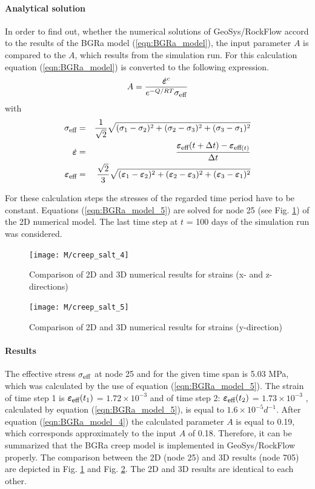 \paragraph*{Analytical solution}
%
In order to find out, whether the numerical solutions of
GeoSys/RockFlow accord to the results of the BGRa model
(\ref{eqn:BGRa_model}), the input parameter $A$ is compared to the
$A$, which results from the simulation run. For this calculation
equation (\ref{eqn:BGRa_model}) is converted to the following
expression.
%
\begin{equation}
A
=
\frac
{\dot{\boldsymbol{\varepsilon}}^{c}}
{e^{-Q/RT} \sigma_{\mbox{\footnotesize eff}}}
\label{eqn:BGRa_model_4}
\end{equation}
%
with
%
\begin{eqnarray}
\sigma_{\mbox{\footnotesize eff}}
&=&
\frac{1}{\sqrt{2}}
\sqrt{(\sigma_1-\sigma_2)^2 + (\sigma_2-\sigma_3)^2 + (\sigma_3-\sigma_1)^2}
\nonumber
\\
\dot{\boldsymbol{\varepsilon}}
&=&
\frac
{\boldsymbol{\varepsilon}_{\mbox{\footnotesize eff}}(t+\Delta t) - \boldsymbol{\varepsilon}_{\mbox{\footnotesize eff}(t)}}
{\Delta t}
\\
\boldsymbol{\varepsilon}_{\mbox{\footnotesize eff}}
&=&
\frac{\sqrt{2}}{3}
\sqrt{(\boldsymbol{\varepsilon}_1-\boldsymbol{\varepsilon}_2)^2 + (\boldsymbol{\varepsilon}_2-\boldsymbol{\varepsilon}_3)^2 + (\boldsymbol{\varepsilon}_3-\boldsymbol{\varepsilon}_1)^2}
\nonumber
\label{eqn:BGRa_model_5}
\end{eqnarray}

For these calculation steps the stresses of the regarded time period
have to be constant. Equations (\ref{eqn:BGRa_model_5}) are solved
for node 25 (see Fig. \ref{fig:creep_salt_4}) of the 2D numerical
model. The last time step at $t$ = 100 days of the simulation run
was considered.
%
\begin{figure}[H]
\centering
\texttt{[image: M/creep\_salt\_4]}
\caption{Comparison of 2D and 3D numerical results for strains (x- and z-directions)}
\label{fig:creep_salt_4}
\end{figure}
%
\begin{figure}[H]
\centering
\texttt{[image: M/creep\_salt\_5]}
\caption{Comparison of 2D and 3D numerical results for strains (y-direction)}
\label{fig:creep_salt_5}
\end{figure}

\paragraph*{Results}
%
The effective stress $\sigma_{\mbox{\footnotesize eff}}$ at node 25
and for the given time span is 5.03 MPa, which was calculated by the
use of equation (\ref{eqn:BGRa_model_5}). The strain of time step 1
is $\boldsymbol{\varepsilon}_{\mbox{\footnotesize eff}}(t_1)$ = $1.72\times 10^{-3}$
and of time step 2: $\boldsymbol{\varepsilon}_{\mbox{\footnotesize eff}}(t_2)$ =
$1.73\times 10^{-3}$ , calculated by equation
(\ref{eqn:BGRa_model_5}), is equal to $1.6 \times 10^{-5} d^{-1}$.
After equation (\ref{eqn:BGRa_model_4}) the calculated parameter $A$
is equal to 0.19, which corresponds approximately to the input $A$
of 0.18. Therefore, it can be summarized that the BGRa creep model
is implemented in GeoSys/RockFlow properly. The comparison between
the 2D (node 25) and 3D results (node 705) are depicted in Fig.
\ref{fig:creep_salt_4} and Fig. \ref{fig:creep_salt_5}. The 2D and
3D results are identical to each other.

